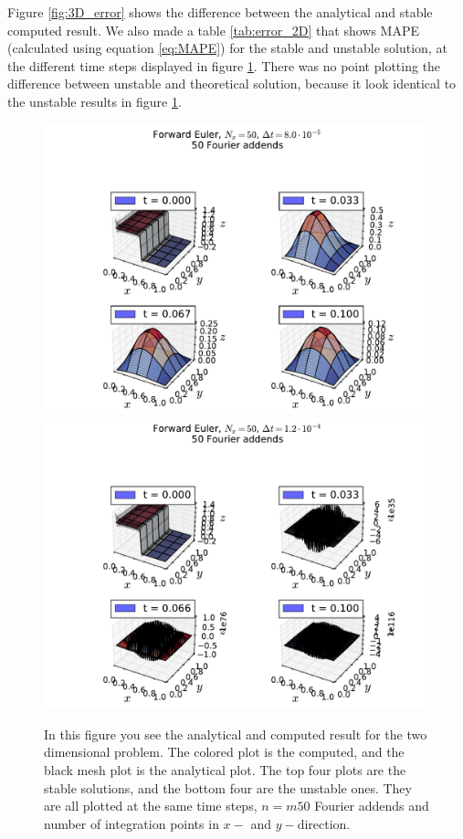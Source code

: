 \documentclass[reprint, english,notitlepage,nofootinbib]{revtex4-1}  %
\begin{document}
Figure \ref{fig:3D_error} shows the difference between the analytical and stable computed result. We also made a table \ref{tab:error_2D} that shows MAPE (calculated using equation \eqref{eq:MAPE}) for the stable and unstable solution, at the different time steps displayed in figure \ref{fig:3D}. There was no point plotting the difference between unstable and theoretical solution, because it look identical to the unstable results in figure \ref{fig:3D}.
\begin{figure}[!htb]
	\includegraphics[width=16cm]{TwoDimensions-Nt1250-dt8_0e-05-Nx50.pdf}
	\includegraphics[width=16cm]{TwoDimensions-Nt833-dt1_2e-04-Nx50.pdf}
	\caption{In this figure you see the analytical and computed result for the two dimensional problem. The colored plot is the computed, and the black mesh plot is the analytical plot. The top four plots are the stable solutions, and the bottom four are the unstable ones. They are all plotted at the same time steps, $n=m50$ Fourier addends and number of integration points in $x-$ and $y-$direction.
	\label{fig:3D}}
\end{figure}
\end{document}
